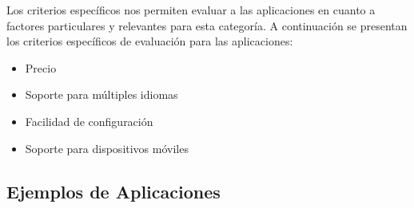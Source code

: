 Los criterios espec\'ificos nos permiten evaluar a las aplicaciones en cuanto a factores
particulares y relevantes para esta categor\'ia. A continuaci\'on se presentan los criterios 
espec\'ificos de evaluaci\'on para las aplicaciones:

\begin{itemize}
    \item Precio
    \item Soporte para m\'ultiples idiomas
    \item Facilidad de configuraci\'on
    \item Soporte para dispositivos m\'oviles
\end{itemize}

\subsection{Ejemplos de Aplicaciones}




